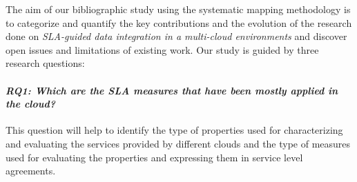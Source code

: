 
 





The aim of our bibliographic study using the systematic mapping methodology \cite{SM:Petersen:2008} is to categorize and quantify the key contributions and the evolution of the research done on \textit{SLA-guided
data integration in a multi-cloud environments} and discover open issues and limitations of existing work.    
Our study is guided by  three research questions:

\paragraph{\textit{\textbf{RQ1:} Which are the SLA measures that have been mostly
applied  in the cloud?}} This question will help  to identify  the type of properties used for characterizing and evaluating the services provided  by different clouds and the type of measures used for evaluating the properties and expressing them in service level agreements.

